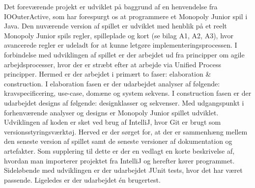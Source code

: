 \begin{flushleft} %
\doublespacing

Det foreværende projekt er udviklet på baggrund af  en henvendelse fra IOOuterActive, som har forespurgt os at programmere et Monopoly Junior spil i Java. Den nuværende version af spillet er udviklet med henblik på et reelt Monopoly Junior spils regler, spilleplade og kort (se bilag A1, A2, A3), hvor avancerede regler er udeladt for at kunne letgøre implementeringsprocessen. 
\addlinespace
I forbindelse med udviklingen af spillet er der arbejdet ud fra principper om agile arbejdsprocesser, hvor der er stræbt efter at arbejde via Unified Process principper. Hermed er der arbejdet i primært to faser: elaboration & construction. I elaboration fasen er der udarbejdet analyser af følgende: kravspecificering, use-case, domæne og system sekvens. I construction fasen er der udarbejdet designs af følgende: designklasser og sekvenser. Med udgangspunkt i forhenværende analyser og designs er Monopoly Junior spillet udviklet.
\addlinespace
Udviklingen af koden er sket ved brug af IntelliJ, hvor Git er brugt som versionsstyringsværktøj. Herved er der sørget for, at der er sammenhæng mellem den seneste version af spillet samt de seneste versioner af dokumentation og artefakter. Som supplering til dette er der en vedlagt en korte beskrivelse af, hvordan man importerer projektet fra IntelliJ og herefter kører programmet.
\addlinespace
Sideløbende med udviklingen er der udarbejdet JUnit tests, hvor det har været passende. Ligeledes er der udarbejdet én brugertest. 


\end{flushleft}
